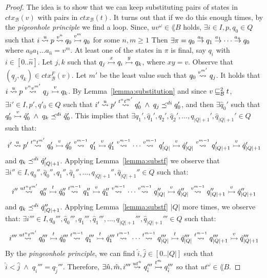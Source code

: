 \begin{proof}
The idea is to show that we can keep substituting pairs of states in $ctx_{\mathcal{B}}(v)$
with pairs in $ctx_{\mathcal{B}}(t)$. It turns out that if we do this enough times, by the \emph{pigeonhole principle}
we find a loop.
Since, $uv^{\omega} \in \lang{B}$ holds,
$ \exists i \in I, p,q_0 \in Q$ such that $i \overset{u}{\rightsquigarrow} p \overset{v^n}{\rightsquigarrow} q_0 \overset{v^m}{\rightarrowtail} q_0$ for some $n,m \geq 1$
Then $\exists \pi = q_0 \overset{a_0}{\rightarrow} q_1 \overset{a_1}{\rightarrow} \cdots \overset{a_{\hat{n}}}{\rightarrow} q_0$ where $a_0a_1 \dots a_{\hat{n}} = v^m$.
At least one of the states in $\pi$ is final, say $q_i$ with $i \in [0..\hat{n}]$.
Let $j,k$ such that $q_j \overset{x}{\rightarrowtail} q_i \overset{y}{\rightarrowtail} q_k$, where $xy=v$.
Observe that $(q_j,q_k) \in ctx^F_{\mathcal{B}}(v)$.
Let $m'$ be the least value such that $q_0 \overset{v^{m'}}{\rightsquigarrow} q_j$.
It holds that $i \overset{u}{\rightsquigarrow} p \overset{v^{n}v^{m'}}{\rightsquigarrow} q_j \overset{v}{\rightarrowtail} q_k$.
By Lemma~\ref{lemma:substitution} and since $v \sqsubseteq_{\mathcal{B}}^{2} t$,
$\exists i' \in I, p', q'_0 \in Q$ such that
$i' \overset{u}{\rightsquigarrow} p' \overset{t^nt^{m'}}{\rightsquigarrow} q_0' \; \wedge \; q_j \preceq^{di} q_0'$, and then
$\exists \hat{q}_0'$ such that $q_0' \overset{v}{\rightarrowtail} \hat{q}'_0 \; \wedge \; q_k \preceq^{di} \hat{q}_0'$.
This implies that $\exists q_1', \hat{q}_1', q_2', \hat{q}_2', \dots, q_{|Q|+1}', \hat{q}_{|Q|+1}' \in Q$ such that:
\[ i' \overset{u}{\rightsquigarrow} p' \overset{t^n t^{m'}}{\rightsquigarrow} q_0' \overset{v}{\rightarrowtail} \hat{q}_0' \overset{v^{m-1}}{\rightsquigarrow} q_1' \overset{v}{\rightarrowtail} \hat{q}_1' \overset{v^{m-1}}{\rightsquigarrow}
\cdots \overset{v^{m-1}}{\rightsquigarrow} q_{|Q|}' \overset{v}{\rightarrowtail} \hat{q}_{|Q|}' \overset{v^{m-1}}{\rightsquigarrow} q_{|Q|+1}' \overset{v}{\rightarrowtail} \hat{q}_{|Q|+1}'\]
and $q_k \preceq^{di} \hat{q}_{|Q|+1}'$.
Applying Lemma~\ref{lemma:substf} we observe that
\sloppy $\exists  i'' \in I, q_0'', \hat{q}_0'', q_1'', \hat{q}_1'', \dots, q_{|Q|+1}'', \hat{q}_{|Q|+1}'' \in Q$
such that:
\[ i'' \overset{ut^n t^{m'}}{\rightsquigarrow} q_0'' \overset{t}{\rightarrowtail} \hat{q}_0'' \overset{t^{m-1}}{\rightsquigarrow} q_1'' \overset{v}{\rightarrowtail} \hat{q}_1'' \overset{v^{m-1}}{\rightsquigarrow}
\cdots \overset{v^{m-1}}{\rightsquigarrow} q_{|Q|}'' \overset{v}{\rightarrowtail} \hat{q}_{|Q|}'' \overset{v^{m-1}}{\rightsquigarrow} q_{|Q|+1}'' \overset{v}{\rightarrowtail} \hat{q}_{|Q|+1}'' \]
and $q_k \preceq^{di} \hat{q}_{|Q|+1}''$.
Applying Lemma~\ref{lemma:substf} $|Q|$ more times, we observe that:
$\exists  i''' \in I, q_0''', \hat{q}_0''', q_1''', \hat{q}_1''', \dots, q_{|Q|+1}''', \hat{q}_{|Q|+1}''' \in Q$ such that:
\[ i''' \overset{ut^n t^{m'}}{\rightsquigarrow} q_0''' \overset{t}{\rightarrowtail} \hat{q}_0''' \overset{t^{m-1}}{\rightsquigarrow} q_1''' \overset{t}{\rightarrowtail} \hat{q}_1''' \overset{t^{m-1}}{\rightsquigarrow}
\cdots \overset{t^{m-1}}{\rightsquigarrow} q_{|Q|}''' \overset{t}{\rightarrowtail} \hat{q}_{|Q|}''' \overset{t^{m-1}}{\rightsquigarrow} q_{|Q|+1}''' \overset{v}{\rightarrowtail} \hat{q}_{|Q|+1}''' \]
By the \emph{pingeonhole principle}, we can find $\hat{i},\hat{j} \in [0..|Q|]$ such that $\hat{i} < \hat{j} \; \wedge \; q_{\hat{i}}''' = q_{\hat{j}}'''$.
Therefore, $\exists \hat{n}, \hat{m}, i''' \overset{ut^{\hat{n}}}{\rightsquigarrow} q_{\hat{i}}''' \overset{t^{\hat{m}}}{\rightarrowtail} q_{\hat{i}}'''$
so that $ut^{\omega} \in \lang{B}$.
\end{proof}

